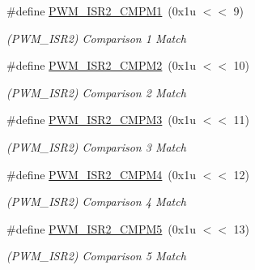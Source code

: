 \begin{DoxyCompactItemize}
\mbox{\label{group__SAME70__PWM_gaf3e6a85fe528741a0a1c32a8a8bb3755}} 
\#define \mbox{\hyperlink{group__SAME70__PWM_gaf3e6a85fe528741a0a1c32a8a8bb3755}{P\+W\+M\+\_\+\+I\+S\+R2\+\_\+\+C\+M\+P\+M1}}~(0x1u $<$$<$ 9)
\begin{DoxyCompactList}\small\item\em (P\+W\+M\+\_\+\+I\+S\+R2) Comparison 1 Match \end{DoxyCompactList}\item 
\mbox{\label{group__SAME70__PWM_ga26aa7d6e543c00c9b4c5e5ba6c89a20e}} 
\#define \mbox{\hyperlink{group__SAME70__PWM_ga26aa7d6e543c00c9b4c5e5ba6c89a20e}{P\+W\+M\+\_\+\+I\+S\+R2\+\_\+\+C\+M\+P\+M2}}~(0x1u $<$$<$ 10)
\begin{DoxyCompactList}\small\item\em (P\+W\+M\+\_\+\+I\+S\+R2) Comparison 2 Match \end{DoxyCompactList}\item 
\mbox{\label{group__SAME70__PWM_gae70463799be2768ca584ccdb80f89257}} 
\#define \mbox{\hyperlink{group__SAME70__PWM_gae70463799be2768ca584ccdb80f89257}{P\+W\+M\+\_\+\+I\+S\+R2\+\_\+\+C\+M\+P\+M3}}~(0x1u $<$$<$ 11)
\begin{DoxyCompactList}\small\item\em (P\+W\+M\+\_\+\+I\+S\+R2) Comparison 3 Match \end{DoxyCompactList}\item 
\mbox{\label{group__SAME70__PWM_ga3c9fd7834754a7d163c36dfecb729558}} 
\#define \mbox{\hyperlink{group__SAME70__PWM_ga3c9fd7834754a7d163c36dfecb729558}{P\+W\+M\+\_\+\+I\+S\+R2\+\_\+\+C\+M\+P\+M4}}~(0x1u $<$$<$ 12)
\begin{DoxyCompactList}\small\item\em (P\+W\+M\+\_\+\+I\+S\+R2) Comparison 4 Match \end{DoxyCompactList}\item 
\mbox{\label{group__SAME70__PWM_gac8cc637e69f50bd5682836481a62e263}} 
\#define \mbox{\hyperlink{group__SAME70__PWM_gac8cc637e69f50bd5682836481a62e263}{P\+W\+M\+\_\+\+I\+S\+R2\+\_\+\+C\+M\+P\+M5}}~(0x1u $<$$<$ 13)
\begin{DoxyCompactList}\small\item\em (P\+W\+M\+\_\+\+I\+S\+R2) Comparison 5 Match \end{DoxyCompactList}\item 
$$
\end{DoxyCompactItemize}
